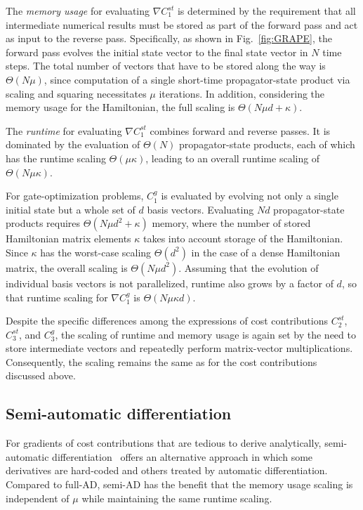 The \textit{memory usage} for evaluating $\nabla C_1^{st}$ is determined by the requirement that all intermediate numerical results must be stored as part of the forward pass and act as input to the reverse pass. Specifically, as shown in Fig.~\ref{fig:GRAPE}, the forward pass evolves the initial state vector to the final state vector in $N$ time steps. The total number of vectors that have to be stored along the way is $\Theta
(N\mu)$, since computation of a single short-time propagator-state product via scaling and squaring necessitates $\mu$ iterations. In addition, considering the memory usage for the Hamiltonian, the full scaling is $\Theta(N\mu d +\kappa)$. 

The \textit{runtime} for evaluating $\nabla C_1^{st}$ combines forward and reverse passes. It is dominated by the evaluation of $\Theta(N)$ propagator-state products, each of which has the runtime scaling $\Theta(\mu\kappa)$, leading to an overall runtime scaling of $\Theta(N\mu \kappa )$.

For gate-optimization problems, $C_1^{ g}$ is evaluated by evolving not only a single initial state but a whole set of $d$ basis vectors. Evaluating $Nd$ propagator-state products requires $\Theta(N\mu d^2+\kappa)$ memory, where the number of stored Hamiltonian matrix elements $\kappa$ takes into account storage of the Hamiltonian. Since $\kappa$ has the worst-case scaling $\Theta(d^2)$ in the case of a dense Hamiltonian matrix, the overall scaling is $\Theta(N\mu d^2)$. Assuming that the evolution of individual basis vectors is not parallelized, runtime also grows by a factor of $d$, so that runtime scaling for $\nabla C_1^{ g}$ is $\Theta(N\mu\kappa d)$.

Despite the specific differences among the expressions of cost contributions $C_2^{st}$, $C_3^{st}$, and $C_3^{g}$, the scaling of runtime and memory usage is again set by the need to store intermediate vectors and repeatedly perform matrix-vector multiplications. Consequently, the scaling remains the same as for the cost contributions discussed above.

\subsection{Semi-automatic differentiation}
\label{sec:semiAD_scaling}

For gradients of cost contributions that are tedious to derive analytically, semi-automatic differentiation~\cite{semiadgoerz2022quantum} offers an alternative approach in which some derivatives are hard-coded and others treated by automatic differentiation. Compared to full-AD, semi-AD has the benefit that the memory usage scaling is independent of $\mu$ while maintaining the same runtime scaling. 


